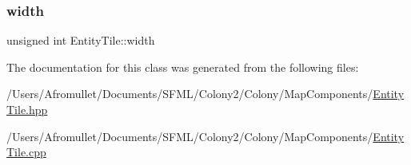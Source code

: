\subsubsection{\texorpdfstring{width}{width}}
{\footnotesize\ttfamily unsigned int Entity\+Tile\+::width\hspace{0.3cm}{\ttfamily [private]}}



The documentation for this class was generated from the following files\+:\begin{DoxyCompactItemize}
\item 
/\+Users/\+Afromullet/\+Documents/\+S\+F\+M\+L/\+Colony2/\+Colony/\+Map\+Components/\mbox{\hyperlink{_entity_tile_8hpp}{Entity\+Tile.\+hpp}}\item 
/\+Users/\+Afromullet/\+Documents/\+S\+F\+M\+L/\+Colony2/\+Colony/\+Map\+Components/\mbox{\hyperlink{_entity_tile_8cpp}{Entity\+Tile.\+cpp}}\end{DoxyCompactItemize}
